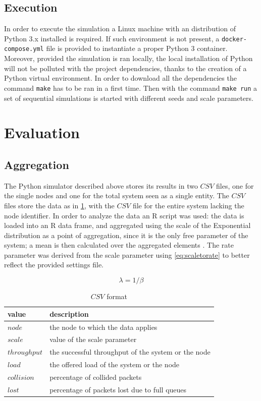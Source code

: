 \documentclass[conference]{IEEEtran}
\begin{document}
\subsection{Execution}\label{sec:execution}
In order to execute the simulation a Linux machine with an distribution of Python 3.x installed is required. If such environment is not present, a \texttt{docker-compose.yml} file is provided to instantiate a proper Python 3 container. Moreover, provided the simulation is ran locally, the local installation of Python will not be polluted with the project dependencies, thanks to the creation of a Python virtual environment. In order to download all the dependencies the command \texttt{make} has to be ran in a first time. Then with the command \texttt{make run} a set of sequential simulations is started with different seeds and scale parameters.

\section{Evaluation}\label{sec:evaluation}

\subsection{Aggregation}\label{sec:aggragation}
The Python simulator described above stores its results in two \(CSV\) files, one for the single nodes and one for the total system seen as a single entity. The \(CSV\) files store the data as in \cref{tab:csvformat}, with the \(CSV\) file for the entire system lacking the node identifier. In order to analyze the data an R script was used: the data is loaded into an R data frame, and aggregated using the scale of the Exponential distribution as a point of aggregation, since it is the only free parameter of the system; a mean is then calculated over the aggregated elements . The rate parameter was derived from the scale parameter using \cref{eq:scaletorate} to better reflect the provided settings file. 

\begin{equation}
    \lambda=1/\beta\label{eq:scaletorate}
\end{equation}

\begin{table}
    \centering
    \caption{\(CSV\) format}
    \label{tab:csvformat}
    \begin{tabular}{l|l}
        \toprule
        value & description \\
        \midrule
        \(node\) & the node to which the data applies \\
        \(scale\) & value of the scale parameter \\
        \(throughput\) & the successful throughput of the system or the node \\
        \(load\) & the offered load of the system or the node \\
        \(collision\) & percentage of collided packets \\
        \(lost\) & percentage of packets lost due to full queues \\
        \bottomrule
    \end{tabular}
\end{table}
\end{document}
